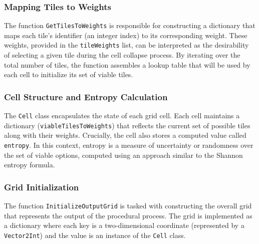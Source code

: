 \documentclass[a4paper, 12pt, one column, aas_macros]{article}
\begin{document}
\subsubsection{Mapping Tiles to Weights}
The function \texttt{GetTilesToWeights} is responsible for constructing a dictionary that maps each tile's identifier (an integer index) to its corresponding weight. These weights, provided in the \texttt{tileWeights} list, can be interpreted as the desirability of selecting a given tile during the cell collapse process. By iterating over the total number of tiles, the function assembles a lookup table that will be used by each cell to initialize its set of viable tiles.

\subsubsection{Cell Structure and Entropy Calculation}
The \texttt{Cell} class encapsulates the state of each grid cell. Each cell maintains a dictionary (\texttt{viableTilesToWeights}) that reflects the current set of possible tiles along with their weights. Crucially, the cell also stores a computed value called \texttt{entropy}. In this context, entropy is a measure of uncertainty or randomness over the set of viable options, computed using an approach similar to the Shannon entropy formula.

\subsubsection{Grid Initialization}
The function \texttt{InitializeOutputGrid} is tasked with constructing the overall grid that represents the output of the procedural process. The grid is implemented as a dictionary where each key is a two-dimensional coordinate (represented by a \texttt{Vector2Int}) and the value is an instance of the \texttt{Cell} class.
\end{document}
